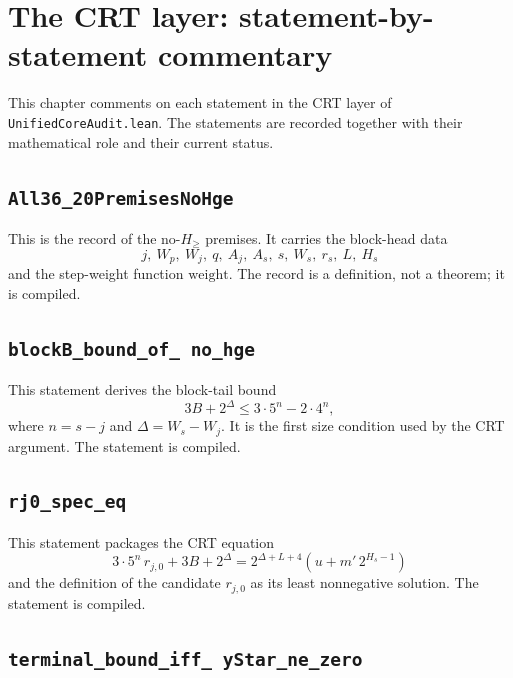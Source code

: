 \section{The CRT layer: statement-by-statement commentary}

This chapter comments on each statement in the CRT layer of
\texttt{UnifiedCoreAudit.lean}.  The statements are recorded together
with their mathematical role and their current status.

\subsection{\texttt{All36\_20PremisesNoHge}}

This is the record of the no-$H_{\ge}$ premises.  It carries the
block-head data
\begin{equation*}
  j,\ W_p,\ W_j,\ q,\ A_j,\ A_s,\ s,\ W_s,\ r_s,\ L,\ H_s
\end{equation*}
and the step-weight function $\mathrm{weight}$.  The record is a
definition, not a theorem; it is compiled.

\subsection{\texttt{blockB\_\allowbreak bound\_\allowbreak of\_\allowbreak
no\_\allowbreak hge}}

This statement derives the block-tail bound
\begin{equation*}
  3B+2^{\Delta}\le3\cdot5^n-2\cdot4^n,
\end{equation*}
where $n=s-j$ and $\Delta=W_s-W_j$.  It is the first size condition
used by the CRT argument.  The statement is compiled.

\subsection{\texttt{rj0\_\allowbreak spec\_\allowbreak eq}}

This statement packages the CRT equation
\begin{equation*}
  3\cdot5^n\,r_{j,0}+3B+2^{\Delta}
    =2^{\Delta+L+4}\left(u+m'\,2^{H_s-1}\right)
\end{equation*}
and the definition of the candidate $r_{j,0}$ as its least
nonnegative solution.  The statement is compiled.

\subsection{\texttt{terminal\_\allowbreak bound\_\allowbreak iff\_\allowbreak
yStar\_\allowbreak ne\_\allowbreak zero}}

